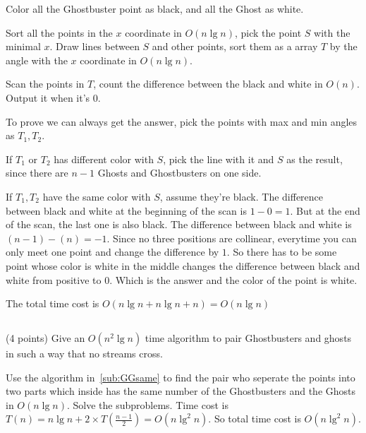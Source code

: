 \documentclass[paper=a4, fontsize=11pt]{scrartcl} %
\begin{document}
Color all the Ghostbuster point as black, and all the Ghost as
white.

Sort all the points in the $x$ coordinate in $O(n\lg{n})$, pick the
point $S$ with the minimal $x$.
Draw lines between $S$ and other points, sort them as a array $T$ by
the angle with the $x$ coordinate in $O(n\lg{n})$.

Scan the points in $T$, count the difference between the black and
white in $O(n)$. Output it when it's $0$.

To prove we can always get the answer,
pick the points with max and min angles as $T_1, T_2$.

If $T_1$ or $T_2$ has different color with $S$, pick the line with
it and $S$ as the result, since there are $n-1$ Ghosts and
Ghostbusters on one side.

If $T_1, T_2$ have the same color with $S$, assume they're black.
The difference between black and white at the beginning of the scan is
$1-0=1$.
But at the end of the scan, the last one is also black. The
difference between black and white is $(n-1)-(n)=-1$.
Since no three positions are collinear, everytime you can only meet
one point and change the difference by $1$.
So there has to be some point whose color is white in the middle
changes the difference between black and white from positive to
$0$. Which is the answer and the color of the point is white.

The total time cost is $O(n\lg{n}+n\lg{n}+n)=O(n\lg{n})$

\subsection{}

\begin{fancyquotes}
  (4 points) Give an $O(n^2\lg{n})$ time algorithm to pair
  Ghostbusters and ghosts in such a way that no streams cross.
\end{fancyquotes}

Use the algorithm in~\ref{sub:GGsame} to find the pair who seperate
the points into two parts which inside has the same number of the
Ghostbusters and the Ghosts in $O(n\lg{n})$. Solve the subproblems.
Time cost is $T(n) = n\lg{n}+2\times T(\frac{n-1}{2}) = O(n\lg^2{n})$.
So total time cost is $O(n\lg^2{n})$.

\pagebreak


\end{document}
